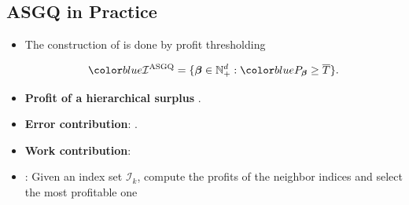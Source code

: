 \documentclass[ima, 20pt, portrait, plainboxedsections]{sciposter}
\begin{document}
\begin{multicols}{3}
\section*{ASGQ in Practice}
\begin{itemize}
		\item The construction of  is done by profit thresholding
		
 \begin{equation*}
 \blue{\mathcal{I}^{\text{ASGQ}}}=\{\boldsymbol{\beta} \in \mathbb{N}^d_{+}: \blue{P_{\boldsymbol{\beta}}}	 \ge \overline{T}\}.
 \end{equation*}
 	\item \textbf{Profit of a hierarchical surplus} .
 \item \textbf{Error contribution}:  .
 \item \textbf{Work contribution}:  
		\item {}: Given an index set $\mathcal{I}_k$, compute the profits of the neighbor indices and select the most profitable one


\end{itemize}
\end{multicols}
\end{document}
